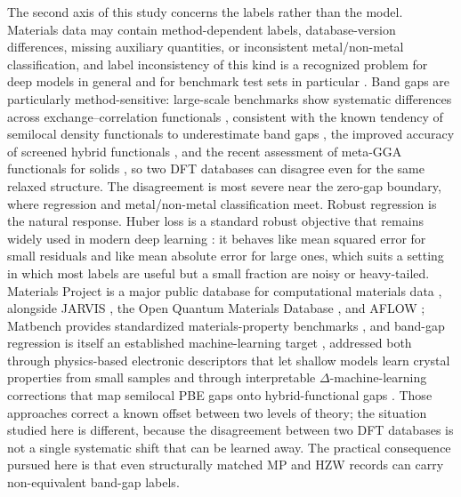 \documentclass[a4paper,11pt]{article}
\begin{document}
The second axis of this study concerns the labels rather than the model. Materials data may contain method-dependent labels, database-version differences, missing auxiliary quantities, or inconsistent metal/non-metal classification, and label inconsistency of this kind is a recognized problem for deep models in general \cite{song2022learning} and for benchmark test sets in particular \cite{northcutt2021pervasive}. Band gaps are particularly method-sensitive: large-scale benchmarks show systematic differences across exchange--correlation functionals \cite{borlido2019large}, consistent with the known tendency of semilocal density functionals to underestimate band gaps \cite{perdew1985density,kuisma2010kohn}, the improved accuracy of screened hybrid functionals \cite{heyd2003hybrid}, and the recent assessment of meta-GGA functionals for solids \cite{kingsbury2022performance}, so two DFT databases can disagree even for the same relaxed structure. The disagreement is most severe near the zero-gap boundary, where regression and metal/non-metal classification meet. Robust regression is the natural response. Huber loss is a standard robust objective \cite{huber1964robust} that remains widely used in modern deep learning \cite{girshick2015fast,barron2019general,meyer2021alternative}: it behaves like mean squared error for small residuals and like mean absolute error for large ones, which suits a setting in which most labels are useful but a small fraction are noisy or heavy-tailed. Materials Project is a major public database for computational materials data \cite{jain2013mp}, alongside JARVIS \cite{choudhary2020jarvis}, the Open Quantum Materials Database \cite{kirklin2015oqmd}, and AFLOW \cite{curtarolo2012aflow}; Matbench provides standardized materials-property benchmarks \cite{dunn2020matbench}, and band-gap regression is itself an established machine-learning target \cite{zhuo2018predicting,ramakrishnan2015big}, addressed both through physics-based electronic descriptors that let shallow models learn crystal properties from small samples \cite{su2021physics} and through interpretable \(\Delta\)-machine-learning corrections that map semilocal PBE gaps onto hybrid-functional gaps \cite{zhang2022deltagap}. Those approaches correct a known offset between two levels of theory; the situation studied here is different, because the disagreement between two DFT databases is not a single systematic shift that can be learned away. The practical consequence pursued here is that even structurally matched MP and HZW records can carry non-equivalent band-gap labels.
\end{document}
